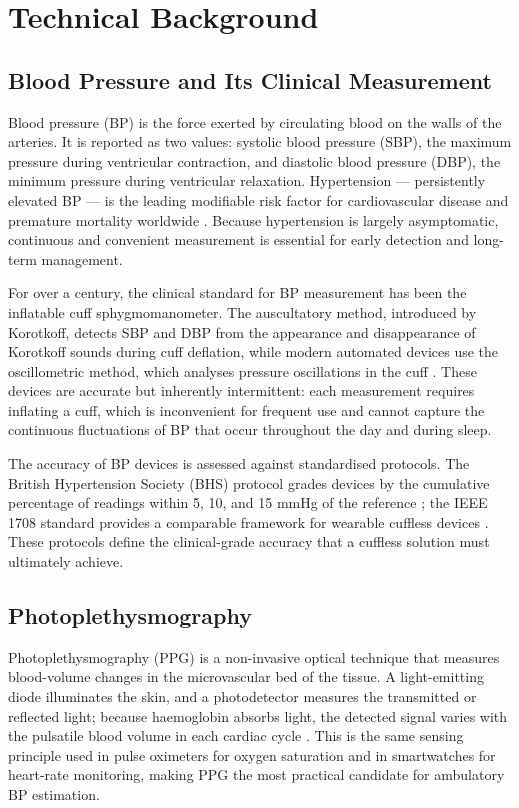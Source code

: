 \chapter{Technical Background}
\label{ch:background}

\section{Blood Pressure and Its Clinical Measurement}

Blood pressure (BP) is the force exerted by circulating blood on the walls of the arteries. It is reported as two values: systolic blood pressure (SBP), the maximum pressure during ventricular contraction, and diastolic blood pressure (DBP), the minimum pressure during ventricular relaxation. Hypertension --- persistently elevated BP --- is the leading modifiable risk factor for cardiovascular disease and premature mortality worldwide \citep{allen2007}. Because hypertension is largely asymptomatic, continuous and convenient measurement is essential for early detection and long-term management.

For over a century, the clinical standard for BP measurement has been the inflatable cuff sphygmomanometer. The auscultatory method, introduced by Korotkoff, detects SBP and DBP from the appearance and disappearance of Korotkoff sounds during cuff deflation, while modern automated devices use the oscillometric method, which analyses pressure oscillations in the cuff \citep{bhs1993}. These devices are accurate but inherently intermittent: each measurement requires inflating a cuff, which is inconvenient for frequent use and cannot capture the continuous fluctuations of BP that occur throughout the day and during sleep.

The accuracy of BP devices is assessed against standardised protocols. The British Hypertension Society (BHS) protocol grades devices by the cumulative percentage of readings within 5, 10, and 15 mmHg of the reference \citep{bhs1993}; the IEEE 1708 standard provides a comparable framework for wearable cuffless devices \citep{ieee1708}. These protocols define the clinical-grade accuracy that a cuffless solution must ultimately achieve.

\section{Photoplethysmography}

Photoplethysmography (PPG) is a non-invasive optical technique that measures blood-volume changes in the microvascular bed of the tissue. A light-emitting diode illuminates the skin, and a photodetector measures the transmitted or reflected light; because haemoglobin absorbs light, the detected signal varies with the pulsatile blood volume in each cardiac cycle \citep{allen2007}. This is the same sensing principle used in pulse oximeters for oxygen saturation and in smartwatches for heart-rate monitoring, making PPG the most practical candidate for ambulatory BP estimation.

